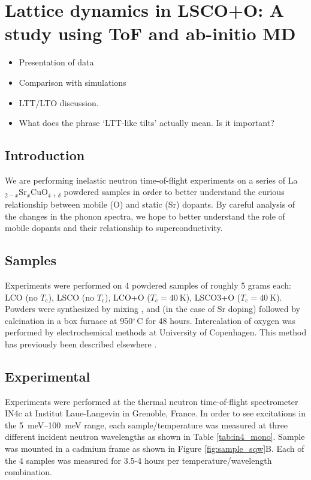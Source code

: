 \chapter{Lattice dynamics in LSCO+O: A study using ToF and ab-initio MD}

\begin{framed}
    \begin{itemize}
        \item Presentation of data
        \item Comparison with simulations
        \item LTT/LTO discussion. 
        \item What does the phrase `LTT-like tilts' actually mean. Is it important?
    \end{itemize}
\end{framed}


\section{Introduction}
We are performing inelastic neutron time-of-flight experiments on a series of La$_{2-x}$Sr$_{x}$CuO$_{4+\delta}$ powdered samples in order to better understand the curious relationship between mobile (O) and static (Sr) dopants. By careful analysis of the changes in the phonon spectra, we hope to better understand the role of mobile dopants and their relationship to superconductivity.

\section{Samples}
Experiments were performed on 4 powdered samples of roughly 5 grams each: LCO (no $T_\text{c}$), LSCO (no $T_\text{c}$), LCO+O ($T_\text{c} = \SI{40}{\kelvin}$), LSCO3+O ($T_\text{c} = \SI{40}{\kelvin}$). Powders were synthesized by mixing ,  and (in the case of Sr doping)  followed by calcination in a box furnace at 950$^\circ \, \text{C}$ for 48 hours. Intercalation of oxygen was performed by electrochemical methods at University of Copenhagen. This method has previously been described elsewhere \cite{Blakeslee1998}.

\section{Experimental}
Experiments were performed at the thermal neutron time-of-flight spectrometer IN4c at Institut Laue-Langevin in Grenoble, France. In order to see excitations in the \SIrange{5}{100}{\milli\eV} range, each sample/temperature was measured at three different incident neutron wavelengths as shown in Table \ref{tab:in4_mono}. Sample was mounted in a cadmium frame as shown in Figure \ref{fig:sample_sqw}B. Each of the 4 samples was measured for 3.5-4 hours per temperature/wavelength combination. 

